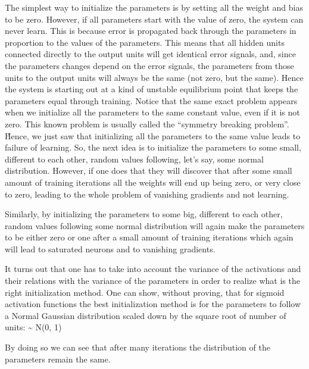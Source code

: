 The simplest way to initialize the parameters is by setting all the weight and bias to be zero. However, if all 
parameters start with the value of zero, the system can never learn. This is because error is propagated back through
the parameters in proportion to the values of the parameters. This means that all hidden units connected directly to 
the output units will get identical error signals, and, since the parameters changes depend on the error signals, the
parameters from those units to the output units will always be the same (not zero, but the same). Hence the system is
starting out at a kind of unstable equilibrium point that keeps the parameters equal through training. Notice that 
the same exact problem appears when we initialize all the parameters to the same constant value, even if it is not 
zero. This known problem is usually called the ``symmetry breaking problem''. \v

Hence, we just saw that initializing all the parameters to the same value leads to failure of learning. So, the next 
idea is to initialize the parameters to some small, different to each other, random values following, let's say, some
normal distribution. However, if one does that they will discover that after some small amount of training iterations
all the weights will end up being zero, or very close to zero, leading to the whole problem of vanishing gradients 
and not learning.


Similarly, by initializing the parameters to some big, different to each other, random values following some normal 
distribution will again make the parameters to be either zero or one after a small amount of training iterations 
which again will lead to saturated neurons and to vanishing gradients.


It turns out that one has to take into account the variance of the activations and their relations with the variance 
of the parameters in order to realize what is the right initialization method. One can show, without proving, that 
for sigmoid activation functions the best initialization method is for the parameters to follow a Normal Gaussian 
distribution scaled down by the square root of number of units:
\bse
\theta \sim {} N(0, 1)
\ese

By doing so we can see that after many iterations the distribution of the parameters remain the same.



